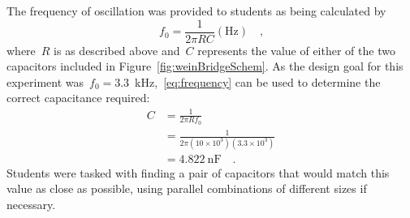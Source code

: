 The frequency of oscillation was provided to students as being calculated by
%
\begin{equation}
	f_0 = \frac{1}{2 \pi R C} (\si{\hertz}) \quad \text{,}
	\label{eq:frequency}
\end{equation}
%
where~$R$ is as described above and~$C$ represents the value of either of the
two capacitors included in Figure~\ref{fig:weinBridgeSchem}.  As the design
goal for this experiment was~$f_0 =
$\SI{3.3}{\kilo\hertz},~\eqref{eq:frequency} can be used to determine the
correct capacitance required:
%
\begin{align*}
	C &= \frac{1}{2 \pi R f_0} \\
	  &= \frac{1}{2 \pi \left(10\times10^3\right) \left(3.3\times10^3\right)} \\
	  &= \SI{4.822}{\nano\farad} \quad \text{.}
\end{align*}
%
Students were tasked with finding a pair of capacitors that would match this
value as close as possible, using parallel combinations of different sizes if
necessary.
